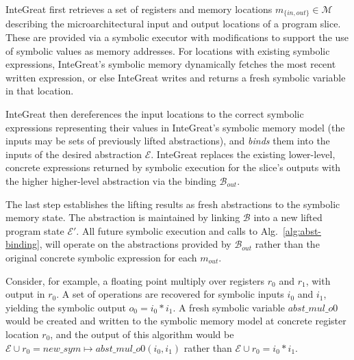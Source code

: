 InteGreat first retrieves a set of registers and memory locations $m_{\{in,out\}} \in \mathcal{M}$ describing the microarchitectural input and output locations of a program slice.
These are provided via a symbolic executor with modifications to support the use of symbolic values as memory addresses.
For locations with existing symbolic expressions, InteGreat's symbolic memory dynamically fetches the most recent written expression, or else InteGreat writes and returns a fresh symbolic variable in that location.

InteGreat then dereferences the input locations to the correct symbolic expressions representing their values in InteGreat's symbolic memory model (the inputs may be sets of previously lifted abstractions), and \emph{binds} them into the inputs of the desired abstraction $\mathcal{E}$.
InteGreat replaces the existing lower-level, concrete expressions returned by symbolic execution for the slice's outputs with the higher higher-level abstraction via the binding $\mathcal{B}_{out}$.

The last step establishes the lifting results as fresh abstractions to the symbolic memory state.
The abstraction is maintained by linking $\mathcal{B}$ into a new lifted program state $\mathcal{E}'$.
All future symbolic execution and calls to Alg.~\ref{alg:abst-binding}, will operate on the abstractions provided by $\mathcal{B}_{out}$ rather than the original concrete symbolic expression for each $m_{out}$.

Consider, for example, a floating point multiply over registers $r_{0}$ and $r_{1}$, with output in $r_{0}$.
A set of operations are recovered for symbolic inputs $i_{0}$ and $i_{1}$, yielding the symbolic output $o_{0} = i_{0} * i_{1}$.
A fresh symbolic variable $abst\_mul\_o0$ would be created and written to the symbolic memory model at concrete register location $r_{0}$, and the output of this algorithm would be $\mathcal{E} \cup r_{0} = new\_sym \mapsto abst\_mul\_o0(i_{0},i_{1})$ rather than $\mathcal{E} \cup r_{0} = i_{0} * i_{1}$.


